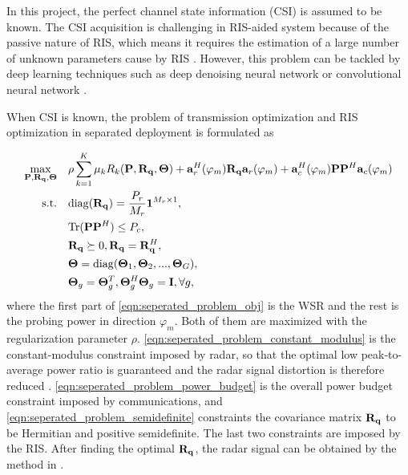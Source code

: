 In this project, the perfect channel state information (CSI) is assumed to be known. The CSI acquisition is
challenging in RIS-aided system because of the passive nature of RIS, which means it requires the estimation of 
a large number of unknown parameters cause by RIS \cite{liu2020RIS}. However, this problem can be tackled by deep learning 
techniques such as deep denoising neural network \cite{liu2020deep} or convolutional neural network \cite{elbir2020deep}.

When CSI is known, the problem of transmission optimization and RIS optimization in separated deployment is formulated as

\begin{subequations}\label{problem:seperated_problem}
    \begin{align}
        \label{eqn:seperated_problem_obj}
        \max_{\mathbf{P},\mathbf{R}_{\bf q},\mathbf{\Theta}} \quad  & \rho\sum_{k=1}^K \mu_k R_k(\mathbf{P},\mathbf{R}_{\bf q},\mathbf{\Theta}) + \mathbf{a}_r^H(\varphi_m)\mathbf{R}_{\bf q} \mathbf{a}_r(\varphi_m) 
         + \mathbf{a}_c^H(\varphi_m)\mathbf{P}\mathbf{P}^H\mathbf{a}_c(\varphi_m)\\
        \label{eqn:seperated_problem_constant_modulus} 
        \mathrm{s.t.} \quad &\mathrm{diag}(\mathbf{R}_{\bf q}) = \frac{P_r}{M_r}\mathbf{1}^{M_r \times 1},\\
        \label{eqn:seperated_problem_power_budget}
        &\mathrm{Tr} (\mathbf{P}\mathbf{P}^H) \leq P_c,\\
        \label{eqn:seperated_problem_semidefinite}
        &\mathbf{R}_{\bf q} \succeq 0, {\bf R}_{\bf q} = {\bf R}_{\bf q}^H, \\
        \label{eqn:seperated_problem_reflecting_1}
        &{\bf \Theta} = \mathrm{diag}({\bf \Theta}_1,{\bf \Theta}_2,...,{\bf \Theta}_G),\\
        \label{eqn:seperated_problem_reflecting_2}
        &{\bf \Theta}_g = {\bf \Theta}_g^T, {\bf \Theta}_g^H{\bf \Theta}_g = {\bf I}, \forall g,
    \end{align}
\end{subequations}
where the first part of \eqref{eqn:seperated_problem_obj} is the WSR and the rest is the probing power
in direction $\varphi_m$. Both of them are maximized with the regularization parameter $\rho$.
\eqref{eqn:seperated_problem_constant_modulus} is the constant-modulus constraint imposed by radar, so that the optimal
low peak-to-average power ratio is guaranteed and the radar signal distortion is therefore reduced \cite{liu2020tutorial}. 
\eqref{eqn:seperated_problem_power_budget} is the overall power budget constraint imposed by communications, and \eqref{eqn:seperated_problem_semidefinite}
constraints the covariance matrix ${\bf{R}}_{\bf q}$ to be Hermitian and positive semidefinite. The last two constraints
are imposed by the RIS. After finding the optimal ${\bf R_q}$, the radar signal can be obtained by the method in \cite{luo2010semidefinite}.


